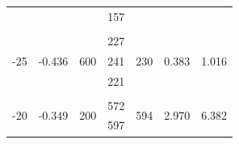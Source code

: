 \documentclass[%
 reprint,
nofootinbib,
 amsmath,amssymb,
 aps,
floatfix,
]{revtex4-2}
\begin{document}
\begin{table}[]
\begin{tabular}{@{}ccccccc@{}}
                                                            &                                                                &                                                         & 157          &                                                                      &                                                                     & \\                                                                                   \\
    \multirow{3}{*}{-25}                                    & \multirow{3}{*}{-0.436}                                        & \multirow{3}{*}{600}                                    & 227          & \multirow{3}{*}{230}                                                 & \multirow{3}{*}{0.383}                                              & \multirow{3}{*}{1.016}                                                            \\
                                                            &                                                                &                                                         & 241          &                                                                      &                                                                     &                                                                                   \\
                                                            &                                                                &                                                         & 221          &                                                                      &                                                                     &  \\                                                                                 \\
    \multirow{3}{*}{-20}                                    & \multirow{3}{*}{-0.349}                                        & \multirow{3}{*}{200}                                    & 572          & \multirow{3}{*}{594}                                                 & \multirow{3}{*}{2.970}                                              & \multirow{3}{*}{6.382}                                                            \\
                                                            &                                                                &                                                         & 597          &                                                                      &                                                                     &                                                                                   \\

\end{tabular}
\end{table}
\end{document}
